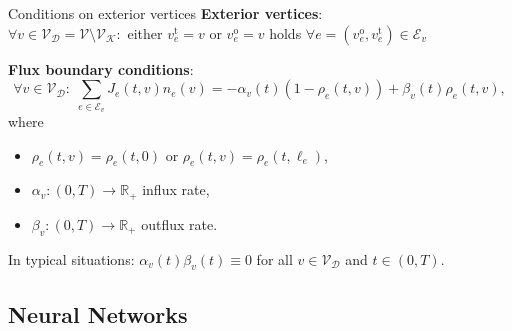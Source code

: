 \documentclass[9pt]{beamer}
\begin{document}
\begin{frame}{Conditions on exterior vertices}
    \textbf{Exterior vertices}: \\
    $\forall v \in \mathcal{V}_\mathcal{D} = \mathcal{V} \setminus \mathcal{V}_\mathcal{K} \colon$ either $v^{\operatorname{t}}_{e} = v$ or $v^{\operatorname{o}}_{e} = v$ holds $\forall e = \left(v^{\operatorname{o}}_{e}, v^{\operatorname{t}}_{e}\right) \in \mathcal{E}_v$ \\

    \vspace{3mm} 

    \textbf{Flux boundary conditions}:
    \begin{equation*}
        \forall v \in \mathcal{V}_\mathcal{D} \colon \; \sum_{e\in \mathcal{E}_v}J_e \left( t, v \right)  n_e  \left( v \right) =-\alpha_v \left( t \right)   \left( 1-\rho_e \left(t, v \right) \right)  + \beta_v \left( t \right)  \rho_e \left(t, v \right),
    \end{equation*}
    where 
    \begin{itemize}
        \item $\rho_e \left(t, v \right) = \rho_e \left(t, 0 \right)$ or $\rho_e \left(t, v \right) = \rho_e \left(t, \ell_e \right)$,
        \item $\alpha_v \colon  \left( 0,T \right)  \to \mathbb{R}_{+}$ influx rate,
        \item $\beta_v \colon  \left( 0,T \right)  \to \mathbb{R}_{+}$ outflux rate.
    \end{itemize}
    In typical situations: $\alpha_v \left( t \right)  \beta_v \left( t \right)  \equiv 0$ for all $v \in \mathcal{V}_\mathcal{D}$ and $t \in  \left( 0,T \right) $.
\end{frame}



\subsection{Neural Networks}
\end{document}
